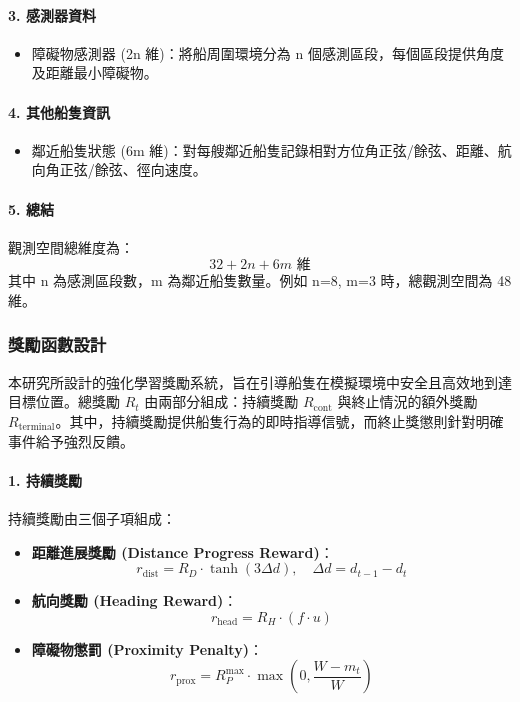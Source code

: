 \documentclass[12pt,a4paper]{article}
\begin{document}
\paragraph{3. 感測器資料}
\begin{itemize}
    \item 障礙物感測器 (2n 維)：將船周圍環境分為 n 個感測區段，每個區段提供角度及距離最小障礙物。
\end{itemize}

\paragraph{4. 其他船隻資訊}
\begin{itemize}
    \item 鄰近船隻狀態 (6m 維)：對每艘鄰近船隻記錄相對方位角正弦/餘弦、距離、航向角正弦/餘弦、徑向速度。
\end{itemize}

\paragraph{5. 總結}
觀測空間總維度為：
\[
32 + 2n + 6m \text{ 維}
\]
其中 n 為感測區段數，m 為鄰近船隻數量。例如 n=8, m=3 時，總觀測空間為 48 維。

\subsubsection{獎勵函數設計}

本研究所設計的強化學習獎勵系統，旨在引導船隻在模擬環境中安全且高效地到達目標位置。總獎勵 $R_t$ 由兩部分組成：持續獎勵 $R_{\text{cont}}$ 與終止情況的額外獎勵 $R_{\text{terminal}}$。其中，持續獎勵提供船隻行為的即時指導信號，而終止獎懲則針對明確事件給予強烈反饋。

\paragraph{1. 持續獎勵}
持續獎勵由三個子項組成：
\begin{itemize}
    \item \textbf{距離進展獎勵 (Distance Progress Reward)}：
    \[
    r_{\text{dist}} = R_D \cdot \tanh(3 \Delta d), \quad \Delta d = d_{t-1}-d_t
    \]
    \item \textbf{航向獎勵 (Heading Reward)}：
    \[
    r_{\text{head}} = R_H \cdot (f \cdot u)
    \]
    \item \textbf{障礙物懲罰 (Proximity Penalty)}：
    \[
    r_{\text{prox}} = R_P^{\max} \cdot \max\!\left(0, \frac{W - m_t}{W}\right)
    \]
\end{itemize}
\end{document}
